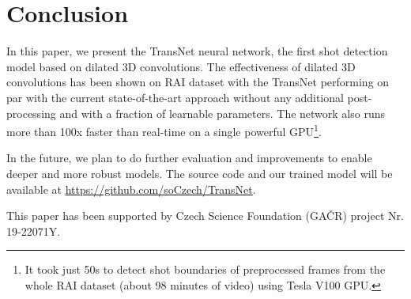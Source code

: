 \section{Conclusion}

In this paper, we present the TransNet neural network, the first shot detection model based on dilated 3D convolutions. The effectiveness of dilated 3D convolutions has been shown on RAI dataset with the TransNet performing on par with the current state-of-the-art approach without any additional post-processing and with a fraction of learnable parameters. The network also runs more than 100x faster than real-time on a single powerful GPU\footnote{It took just 50s to detect shot boundaries of preprocessed frames from the whole RAI dataset (about 98 minutes of video) using Tesla V100 GPU.}.

In the future, we plan to do further evaluation and improvements to enable deeper and more robust models.
The source code and our trained model will be available at \url{https://github.com/soCzech/TransNet}.


\begin{acks}
 This paper has been supported by Czech Science Foundation (GA\v{C}R) project Nr. 19-22071Y.
\end{acks}
